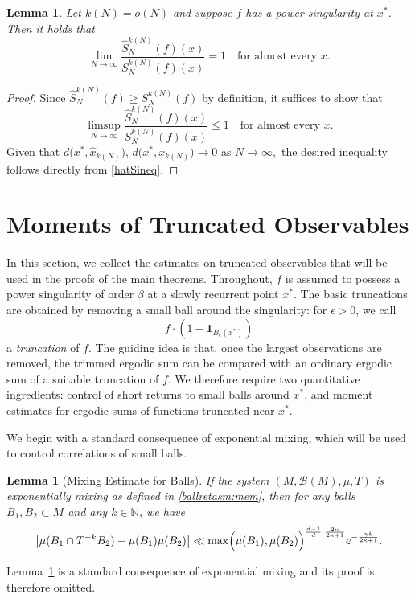 \documentclass[11pt,twoside,a4paper,reqno]{amsart}
\newtheorem{lemma}[theorem]{Lemma}
\def\one{{\mathbf{1}}}
\begin{document}
\begin{lemma}\label{strongsklem}
Let $k(N)=o(N)$ and suppose $f$ has a power singularity at $x^*$. Then it holds that
\begin{equation*}
\lim_{N\rightarrow \infty} \frac{\hat{S}_N^{k(N)}(f)(x)}{S_N^{k(N)}(f)(x)} = 1 \quad \text{for almost every } x.
\end{equation*}
\end{lemma}
\begin{proof}
Since $\hat{S}_N^{k(N)}(f) \geq S_N^{k(N)}(f)$ by definition, it suffices to show that
\begin{equation*}
\limsup_{N\rightarrow \infty} \frac{\hat{S}_N^{k(N)}(f)(x)}{S_N^{k(N)}(f)(x)} \leq 1 \quad \text{for almost every } x.
\end{equation*}
Given that $d\bigl(x^*,\hat{x}_{k(N)}\bigr),\, d\bigl(x^*,x_{k(N)}\bigr) \rightarrow 0$ as $N\to\infty,$ the desired inequality follows directly from \eqref{hatSineq}.
\end{proof}

\section{Moments of Truncated Observables}\label{Tr}
In this section, we collect the estimates on truncated observables that will be used in the proofs of the main theorems. Throughout, $f$ is assumed to possess a power singularity of order $\beta$ at a slowly recurrent point $x^*$. The basic truncations are obtained by removing a small ball around the singularity: for $\epsilon>0$, we call
$$
f\cdot\left(1-\one_{B_\epsilon(x^*)}\right)
$$
a \emph{truncation} of $f$. The guiding idea is that, once the largest observations are removed, the trimmed ergodic sum can be compared with an ordinary ergodic sum of a suitable truncation of $f$. We therefore require two quantitative ingredients: control of short returns to small balls around $x^*$, and moment estimates for ergodic sums of functions truncated near $x^*$.

We begin with a standard consequence of exponential mixing, which will be used to control correlations of small balls.

\begin{lemma}[Mixing Estimate for Balls]\label{MixEmB}
If the system $(M, \mathcal{B}(M), \mu, T)$ is exponentially mixing as defined in \eqref{ballretasm:mem}, then for any balls $B_1, B_2 \subset M$ and any $k \in \mathbb{N}$, we have
$$
\left|\mu(B_1 \cap T^{-k} B_2)-\mu(B_1) \mu(B_2)\right| \ll \max\Bigl(\mu(B_1), \mu(B_2) \Bigr)^{\frac{d-1}{d} \cdot \frac{2\kappa}{2\kappa+1}} e^{-\frac{\gamma k}{2\kappa+1}}.$$
\end{lemma}
Lemma~\ref{MixEmB} is a standard consequence of exponential mixing and its proof is therefore omitted.
\end{document}
